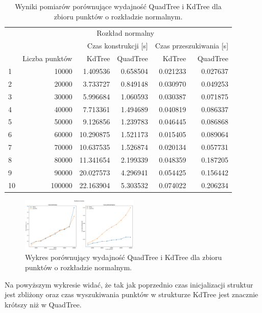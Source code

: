 \documentclass{lab}
\begin{document}
\begin{table}[H]
\centering
\begin{tabular}{lrrrrr}
  \toprule
   & \multicolumn{5}{c}{Rozkład normalny} \\
   &  & \multicolumn{2}{r}{Czas konstrukcji [s]} & \multicolumn{2}{r}{Czas przeszukiwania [s]} \\
   & Liczba punktów & KdTree & QuadTree & KdTree & QuadTree \\
  \midrule
  1 & 10000 & 1.409536 & 0.658504 & 0.021233 & 0.027637 \\
  2 & 20000 & 3.733727 & 0.849148 & 0.030970 & 0.049253 \\
  3 & 30000 & 5.996684 & 1.060593 & 0.030387 & 0.071875 \\
  4 & 40000 & 7.713361 & 1.494689 & 0.040819 & 0.086337 \\
  5 & 50000 & 9.126856 & 1.239783 & 0.046445 & 0.086868 \\
  6 & 60000 & 10.290875 & 1.521173 & 0.015405 & 0.089064 \\
  7 & 70000 & 10.637535 & 1.526874 & 0.020134 & 0.057731 \\
  8 & 80000 & 11.341654 & 2.199339 & 0.048359 & 0.187205 \\
  9 & 90000 & 20.027573 & 4.296941 & 0.054425 & 0.156442 \\
  10 & 100000 & 22.163904 & 5.303532 & 0.074022 & 0.206234 \\
  \bottomrule
  \end{tabular}
\caption{Wyniki pomiarów porównujące wydajność QuadTree i KdTree dla zbioru punktów o rozkładzie normalnym.}
\label{tab:normal_time}
\end{table}  

\begin{figure}[H]
  \centering
  \includegraphics[width=0.5\textwidth]{resources/normal_graph.png}
  \caption{Wykres porównujący wydajność QuadTree i KdTree dla zbioru punktów o rozkładzie normalnym.}
  \label{fig:normal_graph}
\end{figure}

Na powyższym wykresie widać, że tak jak poprzednio czas inicjalizacji struktur jest zbliżony oraz czas wyszukiwania punktów w strukturze KdTree jest znacznie krótszy niż w QuadTree.
\end{document}

